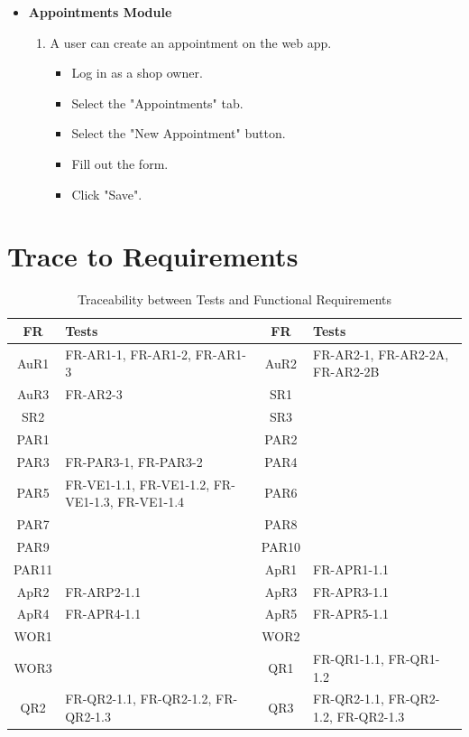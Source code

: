 \documentclass[12pt, titlepage]{article}
\begin{document}
\begin{itemize}
\begin{enumerate}
\begin{itemize}
        \end{itemize}
    \end{enumerate}
    \item \textbf{Appointments Module}
    \begin{enumerate}
        \item A user can create an appointment on the web app.
        \begin{itemize}
            \item Log in as a shop owner.
            \item Select the "Appointments" tab.
            \item Select the "New Appointment" button.
            \item Fill out the form.
            \item Click "Save".
        \end{itemize}
    \end{enumerate}
\end{itemize}


\newpage
\section{Trace to Requirements}

    \begin{table}[H]
        \centering
        \begin{tabularx}{\textwidth}{|c|X|c|X|}
            \hline
            \textbf{FR} & \textbf{Tests} & \textbf{FR} & \textbf{Tests} \\ \hline
            AuR1 & FR-AR1-1, FR-AR1-2, FR-AR1-3 & AuR2 & FR-AR2-1, FR-AR2-2A, FR-AR2-2B \\ \hline
            AuR3 & FR-AR2-3 & SR1 & \\ \hline
            SR2 & & SR3 & \\ \hline
            PAR1 & & PAR2 & \\ \hline
            PAR3 & FR-PAR3-1, FR-PAR3-2 & PAR4 & \\ \hline
            PAR5 & FR-VE1-1.1, FR-VE1-1.2, FR-VE1-1.3, FR-VE1-1.4 & PAR6 & \\ \hline
            PAR7 & & PAR8 & \\ \hline
            PAR9 & & PAR10 & \\ \hline
            PAR11 & & ApR1 & FR-APR1-1.1 \\ \hline
            ApR2 & FR-ARP2-1.1 & ApR3 & FR-APR3-1.1 \\ \hline
            ApR4 & FR-APR4-1.1 & ApR5 & FR-APR5-1.1 \\ \hline
            WOR1 & & WOR2 & \\ \hline
            WOR3 & & QR1 & FR-QR1-1.1, FR-QR1-1.2 \\ \hline
            QR2 & FR-QR2-1.1, FR-QR2-1.2, FR-QR2-1.3 & QR3 & FR-QR2-1.1, FR-QR2-1.2, FR-QR2-1.3 \\ \hline
        \end{tabularx}
        \caption{Traceability between Tests and Functional Requirements}
        \label{tab:frtrace}
    \end{table}
\end{document}
